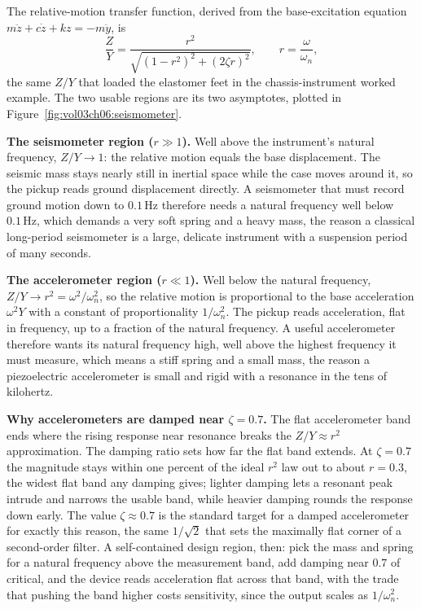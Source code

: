 The relative-motion transfer function, derived from the base-excitation
equation $m\ddot{z} + c\dot{z} + kz = -m\ddot{y}$, is
\[
\frac{Z}{Y} = \frac{r^2}{\sqrt{(1 - r^2)^2 + (2\zeta r)^2}}, \qquad
r = \frac{\omega}{\omega_n},
\]
the same $Z/Y$ that loaded the elastomer feet in the chassis-instrument
worked example. The two usable regions are its two asymptotes, plotted
in Figure~\ref{fig:vol03ch06:seismometer}.



\textbf{The seismometer region ($r \gg 1$).} Well above the
instrument's natural frequency, $Z/Y \to 1$: the relative motion equals
the base displacement. The seismic mass stays nearly still in inertial
space while the case moves around it, so the pickup reads ground
displacement directly. A seismometer that must record ground motion down
to $0.1\,\si{\hertz}$ therefore needs a natural frequency well below
$0.1\,\si{\hertz}$, which demands a very soft spring and a heavy mass,
the reason a classical long-period seismometer is a large, delicate
instrument with a suspension period of many seconds.

\textbf{The accelerometer region ($r \ll 1$).} Well below the natural
frequency, $Z/Y \to r^2 = \omega^2/\omega_n^2$, so the relative motion
is proportional to the base acceleration $\omega^2 Y$ with a constant of
proportionality $1/\omega_n^2$. The pickup reads acceleration, flat in
frequency, up to a fraction of the natural frequency. A useful
accelerometer therefore wants its natural frequency high, well above the
highest frequency it must measure, which means a stiff spring and a small
mass, the reason a piezoelectric accelerometer is small and rigid with a
resonance in the tens of kilohertz.

\textbf{Why accelerometers are damped near $\zeta = 0.7$.} The flat
accelerometer band ends where the rising response near resonance breaks
the $Z/Y \approx r^2$ approximation. The damping ratio sets how far the
flat band extends. At $\zeta = 0.7$ the magnitude stays within one
percent of the ideal $r^2$ law out to about $r = 0.3$, the widest flat
band any damping gives; lighter damping lets a resonant peak intrude and
narrows the usable band, while heavier damping rounds the response down
early. The value $\zeta \approx 0.7$ is the standard target for a
damped accelerometer for exactly this reason, the same $1/\sqrt2$ that
sets the maximally flat corner of a second-order filter. A
self-contained design region, then: pick the mass and spring for a
natural frequency above the measurement band, add damping near $0.7$ of
critical, and the device reads acceleration flat across that band, with
the trade that pushing the band higher costs sensitivity, since the
output scales as $1/\omega_n^2$.

